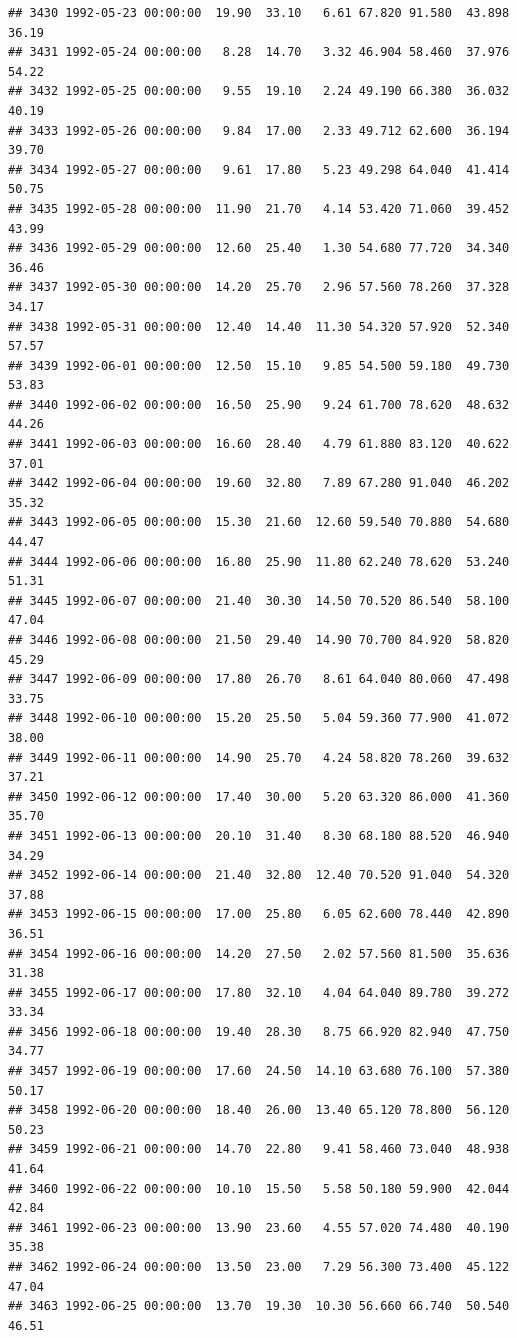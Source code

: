 \documentclass{article}\usepackage{graphicx, color}
\makeatletter
\newenvironment{kframe}{%
 \def\at@end@of@kframe{}%
 \ifinner\ifhmode%
  \def\at@end@of@kframe{\end{minipage}}%
  \begin{minipage}{\columnwidth}%
 \fi\fi%
 \def\FrameCommand##1{\hskip\@totalleftmargin \hskip-\fboxsep
 \colorbox{shadecolor}{##1}\hskip-\fboxsep
     \hskip-\linewidth \hskip-\@totalleftmargin \hskip\columnwidth}%
 \MakeFramed {\advance\hsize-\width
   \@totalleftmargin\z@ \linewidth\hsize
   \@setminipage}}%
 {\par\unskip\endMakeFramed%
 \at@end@of@kframe}
\newenvironment{knitrout}{}{} %
\makeatother
\begin{document}
\begin{knitrout}
\begin{kframe}
\begin{verbatim}
## 3430 1992-05-23 00:00:00  19.90  33.10   6.61 67.820 91.580  43.898  36.19
## 3431 1992-05-24 00:00:00   8.28  14.70   3.32 46.904 58.460  37.976  54.22
## 3432 1992-05-25 00:00:00   9.55  19.10   2.24 49.190 66.380  36.032  40.19
## 3433 1992-05-26 00:00:00   9.84  17.00   2.33 49.712 62.600  36.194  39.70
## 3434 1992-05-27 00:00:00   9.61  17.80   5.23 49.298 64.040  41.414  50.75
## 3435 1992-05-28 00:00:00  11.90  21.70   4.14 53.420 71.060  39.452  43.99
## 3436 1992-05-29 00:00:00  12.60  25.40   1.30 54.680 77.720  34.340  36.46
## 3437 1992-05-30 00:00:00  14.20  25.70   2.96 57.560 78.260  37.328  34.17
## 3438 1992-05-31 00:00:00  12.40  14.40  11.30 54.320 57.920  52.340  57.57
## 3439 1992-06-01 00:00:00  12.50  15.10   9.85 54.500 59.180  49.730  53.83
## 3440 1992-06-02 00:00:00  16.50  25.90   9.24 61.700 78.620  48.632  44.26
## 3441 1992-06-03 00:00:00  16.60  28.40   4.79 61.880 83.120  40.622  37.01
## 3442 1992-06-04 00:00:00  19.60  32.80   7.89 67.280 91.040  46.202  35.32
## 3443 1992-06-05 00:00:00  15.30  21.60  12.60 59.540 70.880  54.680  44.47
## 3444 1992-06-06 00:00:00  16.80  25.90  11.80 62.240 78.620  53.240  51.31
## 3445 1992-06-07 00:00:00  21.40  30.30  14.50 70.520 86.540  58.100  47.04
## 3446 1992-06-08 00:00:00  21.50  29.40  14.90 70.700 84.920  58.820  45.29
## 3447 1992-06-09 00:00:00  17.80  26.70   8.61 64.040 80.060  47.498  33.75
## 3448 1992-06-10 00:00:00  15.20  25.50   5.04 59.360 77.900  41.072  38.00
## 3449 1992-06-11 00:00:00  14.90  25.70   4.24 58.820 78.260  39.632  37.21
## 3450 1992-06-12 00:00:00  17.40  30.00   5.20 63.320 86.000  41.360  35.70
## 3451 1992-06-13 00:00:00  20.10  31.40   8.30 68.180 88.520  46.940  34.29
## 3452 1992-06-14 00:00:00  21.40  32.80  12.40 70.520 91.040  54.320  37.88
## 3453 1992-06-15 00:00:00  17.00  25.80   6.05 62.600 78.440  42.890  36.51
## 3454 1992-06-16 00:00:00  14.20  27.50   2.02 57.560 81.500  35.636  31.38
## 3455 1992-06-17 00:00:00  17.80  32.10   4.04 64.040 89.780  39.272  33.34
## 3456 1992-06-18 00:00:00  19.40  28.30   8.75 66.920 82.940  47.750  34.77
## 3457 1992-06-19 00:00:00  17.60  24.50  14.10 63.680 76.100  57.380  50.17
## 3458 1992-06-20 00:00:00  18.40  26.00  13.40 65.120 78.800  56.120  50.23
## 3459 1992-06-21 00:00:00  14.70  22.80   9.41 58.460 73.040  48.938  41.64
## 3460 1992-06-22 00:00:00  10.10  15.50   5.58 50.180 59.900  42.044  42.84
## 3461 1992-06-23 00:00:00  13.90  23.60   4.55 57.020 74.480  40.190  35.38
## 3462 1992-06-24 00:00:00  13.50  23.00   7.29 56.300 73.400  45.122  47.04
## 3463 1992-06-25 00:00:00  13.70  19.30  10.30 56.660 66.740  50.540  46.51

\end{verbatim}
\end{kframe}
\end{knitrout}
\end{document}
